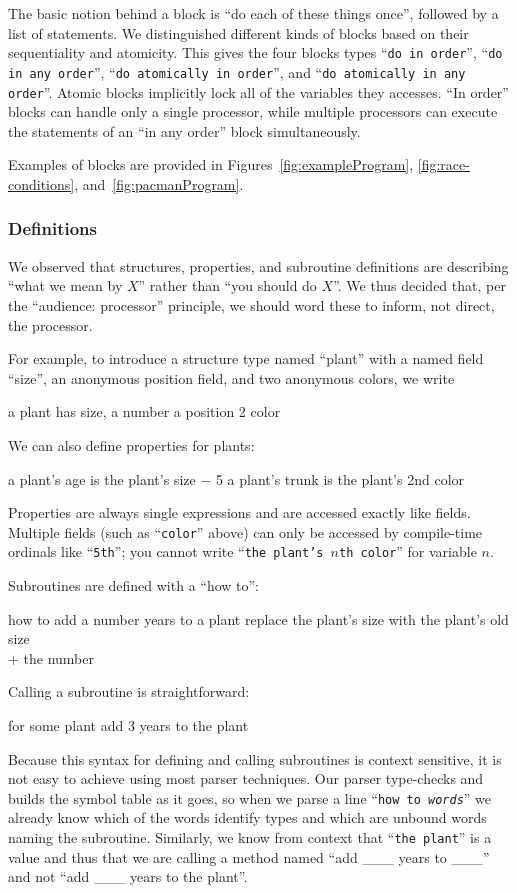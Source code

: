 \documentclass{sig-alternate}
\newcommand{\INDSTATE}[1][1]{\STATE\hspace{#1\algorithmicindent}}
\newenvironment{snippet}{\begin{algorithmic}\ttfamily\lsstyle}{\end{algorithmic}}
\newcommand{\code}[1]{``\texttt{\lsstyle#1}''}
\begin{document}
The basic notion behind a block is ``do each of these things once'', followed by a list of statements.
We distinguished different kinds of blocks based on their sequentiality and atomicity.
This gives the four blocks types \code{do in order}, \code{do in any order}, \code{do atomically in order}, and \code{do atomically in any order}.
Atomic blocks implicitly lock all of the variables they accesses.
``In order'' blocks can handle only a single processor, while multiple processors can execute the statements of an ``in any order'' block simultaneously.

Examples of blocks are provided in Figures~\ref{fig:exampleProgram}, \ref{fig:race-conditions}, and~\ref{fig:pacmanProgram}.



\subsubsection{Definitions}
We observed that structures, properties, and subroutine definitions
are describing ``what we mean by $X$'' rather than ``you should do $X$''.
We thus decided that, per the ``audience: processor'' principle, 
we should word these to inform, not direct, the processor.

For example, to introduce a structure type named ``plant''
with a named field ``size'', an anonymous position field, and two anonymous colors,
we write
\begin{snippet}
\STATE a plant has
\INDSTATE size, a number
\INDSTATE a position
\INDSTATE 2 color
\end{snippet}
We can also define properties for plants:
\begin{snippet}
\STATE a plant's age is the plant's size $-$ 5
\STATE a plant's trunk is the plant's 2nd color
\end{snippet}
Properties are always single expressions and are accessed exactly like fields.
Multiple fields (such as \code{color} above) can only be accessed by compile-time ordinals like \code{5th};
you cannot write \code{the plant's $n$th color} for variable $n$.

Subroutines are defined with a ``how to'':
\begin{snippet}
\STATE how to add a number years to a plant
\INDSTATE replace the plant's size with the plant's old size\\\hspace*{3\algorithmicindent} + the number
\end{snippet}
Calling a subroutine is straightforward:
\begin{snippet}
\STATE for some plant
\INDSTATE add 3 years to the plant
\end{snippet}
Because this syntax for defining and calling subroutines
is context sensitive, it is not easy to achieve using most parser techniques.
Our parser type-checks and builds the symbol table as it goes,
so when we parse a line \code{how to {\it words}}
we already know which of the words identify types and which are unbound words naming the subroutine.
Similarly, we know from context that \code{the plant} is a value
and thus that we are calling a method named ``add \_\_\_ years to \_\_\_'' and not ``add \_\_\_ years to the plant''.
\end{document}
